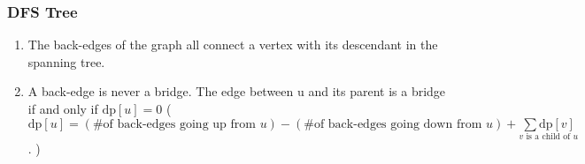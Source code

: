 \subsubsection{DFS Tree}
\begin{enumerate}
	\setlength\itemsep{-0.5em}
	\item The back-edges of the graph all connect a vertex with its descendant in the spanning tree.
	\item A back-edge is never a bridge. The edge between u and its parent is a bridge if and only if $\mathrm{dp}[u] = 0$ ($\mathrm{dp}[u] = (\text{\# of back-edges going up from } u) - (\text{\# of back-edges going down from } u) + \underset{v \text{ is a child of } u}{\sum \mathrm{dp}[v]}$.
)
\end{enumerate}


